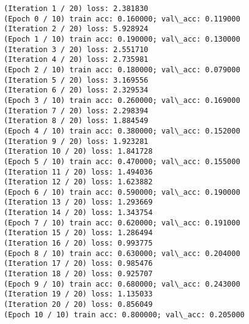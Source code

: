 \documentclass[11pt]{article}
\begin{document}
    \begin{Verbatim}[commandchars=\\\{\}]
(Iteration 1 / 20) loss: 2.381830
(Epoch 0 / 10) train acc: 0.160000; val\_acc: 0.119000
(Iteration 2 / 20) loss: 5.928924
(Epoch 1 / 10) train acc: 0.190000; val\_acc: 0.130000
(Iteration 3 / 20) loss: 2.551710
(Iteration 4 / 20) loss: 2.735981
(Epoch 2 / 10) train acc: 0.180000; val\_acc: 0.079000
(Iteration 5 / 20) loss: 3.169556
(Iteration 6 / 20) loss: 2.329534
(Epoch 3 / 10) train acc: 0.260000; val\_acc: 0.169000
(Iteration 7 / 20) loss: 2.298394
(Iteration 8 / 20) loss: 1.884549
(Epoch 4 / 10) train acc: 0.380000; val\_acc: 0.152000
(Iteration 9 / 20) loss: 1.923281
(Iteration 10 / 20) loss: 1.841728
(Epoch 5 / 10) train acc: 0.470000; val\_acc: 0.155000
(Iteration 11 / 20) loss: 1.494036
(Iteration 12 / 20) loss: 1.623882
(Epoch 6 / 10) train acc: 0.590000; val\_acc: 0.190000
(Iteration 13 / 20) loss: 1.293669
(Iteration 14 / 20) loss: 1.343754
(Epoch 7 / 10) train acc: 0.620000; val\_acc: 0.191000
(Iteration 15 / 20) loss: 1.286494
(Iteration 16 / 20) loss: 0.993775
(Epoch 8 / 10) train acc: 0.630000; val\_acc: 0.204000
(Iteration 17 / 20) loss: 0.985476
(Iteration 18 / 20) loss: 0.925707
(Epoch 9 / 10) train acc: 0.680000; val\_acc: 0.243000
(Iteration 19 / 20) loss: 1.135033
(Iteration 20 / 20) loss: 0.856049
(Epoch 10 / 10) train acc: 0.800000; val\_acc: 0.205000

    \end{Verbatim}
\end{document}
